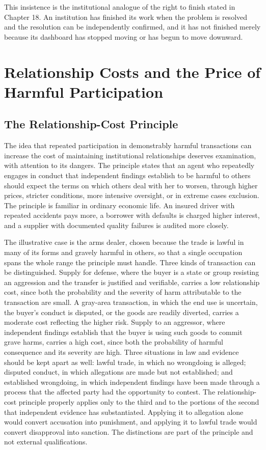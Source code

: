 \documentclass[11pt]{report}
\theoremstyle{definition}
\theoremstyle{remark}
\begin{document}
This insistence is the institutional analogue of the right to finish stated in Chapter 18. An institution has finished its work when the problem is resolved and the resolution can be independently confirmed, and it has not finished merely because its dashboard has stopped moving or has begun to move downward.

\chapter{Relationship Costs and the Price of Harmful Participation}

\section{The Relationship-Cost Principle}

The idea that repeated participation in demonstrably harmful transactions can increase the cost of maintaining institutional relationships deserves examination, with attention to its dangers. The principle states that an agent who repeatedly engages in conduct that independent findings establish to be harmful to others should expect the terms on which others deal with her to worsen, through higher prices, stricter conditions, more intensive oversight, or in extreme cases exclusion. The principle is familiar in ordinary economic life. An insured driver with repeated accidents pays more, a borrower with defaults is charged higher interest, and a supplier with documented quality failures is audited more closely.

The illustrative case is the arms dealer, chosen because the trade is lawful in many of its forms and gravely harmful in others, so that a single occupation spans the whole range the principle must handle. Three kinds of transaction can be distinguished. Supply for defense, where the buyer is a state or group resisting an aggression and the transfer is justified and verifiable, carries a low relationship cost, since both the probability and the severity of harm attributable to the transaction are small. A gray-area transaction, in which the end use is uncertain, the buyer's conduct is disputed, or the goods are readily diverted, carries a moderate cost reflecting the higher risk. Supply to an aggressor, where independent findings establish that the buyer is using such goods to commit grave harms, carries a high cost, since both the probability of harmful consequence and its severity are high. Three situations in law and evidence should be kept apart as well: lawful trade, in which no wrongdoing is alleged; disputed conduct, in which allegations are made but not established; and established wrongdoing, in which independent findings have been made through a process that the affected party had the opportunity to contest. The relationship-cost principle properly applies only to the third and to the portions of the second that independent evidence has substantiated. Applying it to allegation alone would convert accusation into punishment, and applying it to lawful trade would convert disapproval into sanction. The distinctions are part of the principle and not external qualifications.
\end{document}
